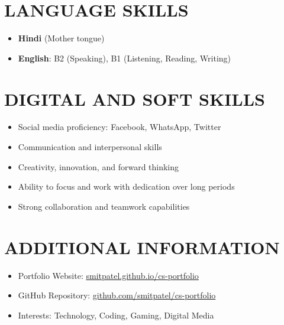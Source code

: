 \documentclass[a4paper,10pt]{article}
\newcommand{\cvsection}[1]{\section*{\uppercase{#1}}}
\begin{document}
\cvsection{Language Skills}
\begin{itemize}
    \item \textbf{Hindi} (Mother tongue)
    \item \textbf{English}: B2 (Speaking), B1 (Listening, Reading, Writing)
\end{itemize}

\vspace{0.5cm}

\cvsection{Digital and Soft Skills}
\begin{itemize}
    \item Social media proficiency: Facebook, WhatsApp, Twitter
    \item Communication and interpersonal skills
    \item Creativity, innovation, and forward thinking
    \item Ability to focus and work with dedication over long periods
    \item Strong collaboration and teamwork capabilities
\end{itemize}

\vspace{0.5cm}

\cvsection{Additional Information}
\begin{itemize}
    \item Portfolio Website: \href{https://smitpatel.github.io/cs-portfolio}{smitpatel.github.io/cs-portfolio}
    \item GitHub Repository: \href{https://github.com/smitpatel/cs-portfolio}{github.com/smitpatel/cs-portfolio}
    \item Interests: Technology, Coding, Gaming, Digital Media
\end{itemize}
\end{document}
